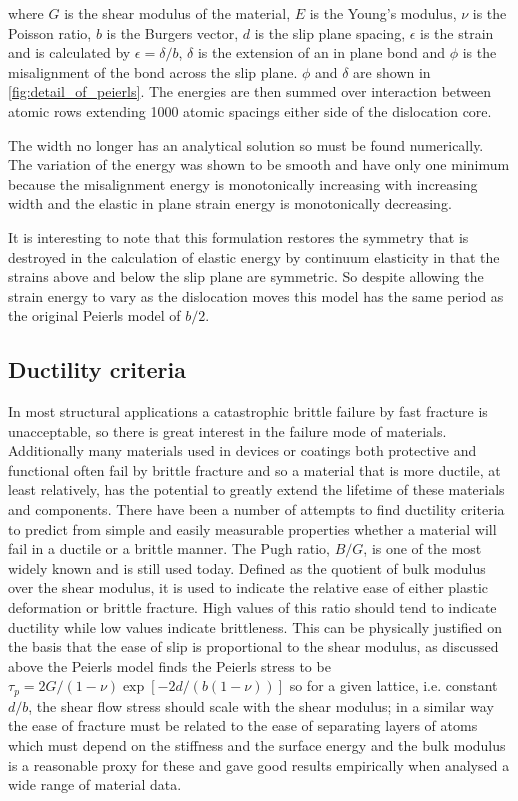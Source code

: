 where $G$ is the shear modulus of the material, $E$ is the Young's modulus, $\nu$ is the Poisson ratio, $b$ is the Burgers vector, $d$ is the slip plane spacing, $\epsilon$ is the strain and is calculated by $\epsilon = \delta/b$, $\delta$ is the extension of an in plane bond and $\phi$ is the misalignment of the bond across the slip plane. $\phi$ and $\delta$ are shown in \autoref{fig:detail_of_peierls}. The energies are then summed over interaction between atomic rows extending 1000 atomic spacings either side of the dislocation core.

The width no longer has an analytical solution so must be found numerically. The variation of the energy was shown to be smooth and have only one minimum because the misalignment energy is monotonically increasing with increasing width and the elastic in plane strain energy is monotonically decreasing.

It is interesting to note that this formulation restores the symmetry that is destroyed in the calculation of elastic energy by continuum elasticity in that the strains above and below the slip plane are symmetric. So despite allowing the strain energy to vary as the dislocation moves this model has the same period as the original Peierls model of $b/2$.






\newpage

\subsection{Ductility criteria}
\label{subsec:ductility_criteria}
 In most structural applications a catastrophic brittle failure by fast fracture is unacceptable, so there is great interest in the failure mode of materials. Additionally many materials used in devices or coatings both protective and functional often fail by brittle fracture and so a material that is more ductile, at least relatively, has the potential to greatly extend the lifetime of these materials and components.
There have been a number of attempts to find ductility criteria to predict from simple and easily measurable properties whether a material will fail in a ductile or a brittle manner.
The Pugh ratio, $B/G$, is one of the most widely known and is still used today. Defined as the quotient of bulk modulus over the shear modulus, it is used to indicate the relative ease of either plastic deformation or brittle fracture. High values of this ratio should tend to indicate ductility while low values indicate brittleness. This can be physically justified on the basis that the ease of slip is proportional to the shear modulus, as discussed above the Peierls model finds the Peierls stress to be $\tau_p = 2G / (1-\nu) \exp[-2d/(b(1-\nu))]$ so for a given lattice, i.e. constant $d/b$, the shear flow stress should scale with the shear modulus; in a similar way the ease of fracture must be related to the ease of separating layers of atoms which must depend on the stiffness and the surface energy and the bulk modulus is a reasonable proxy for these and gave good results empirically when \citet{Pugh1954} analysed a wide range of material data.


